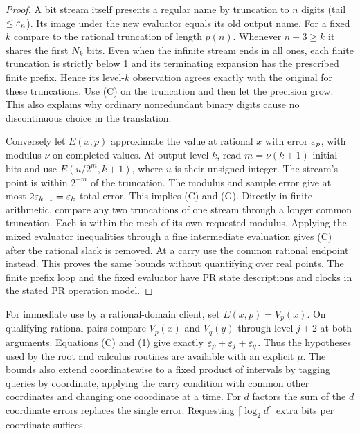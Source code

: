 \begin{proof}
A bit stream itself presents a regular name by truncation to $n$ digits (tail $\le\varepsilon_n$). Its image under the new evaluator equals its old output name. For a fixed $k$ compare to the rational truncation of length $p(n)$. Whenever $n+3\ge k$ it shares the first $N_k$ bits. Even when the infinite stream ends in all ones, each finite truncation is strictly below 1 and its terminating expansion has the prescribed finite prefix. Hence its level-$k$ observation agrees exactly with the original for these truncations. Use (C) on the truncation and then let the precision grow. This also explains why ordinary nonredundant binary digits cause no discontinuous choice in the translation.

Conversely let $E(x,p)$ approximate the value at rational $x$ with error $\varepsilon_p$, with modulus $\nu$ on completed values. At output level $k$, read $m=\nu(k+1)$ initial bits and use $E(u/2^m,k+1)$, where $u$ is their unsigned integer. The stream's point is within $2^{-m}$ of the truncation. The modulus and sample error give at most $2\varepsilon_{k+1}=\varepsilon_k$ total error. This implies (C) and (G). Directly in finite arithmetic, compare any two truncations of one stream through a longer common truncation. Each is within the mesh of its own requested modulus. Applying the mixed evaluator inequalities through a fine intermediate evaluation gives (C) after the rational slack is removed. At a carry use the common rational endpoint instead. This proves the same bounds without quantifying over real points. The finite prefix loop and the fixed evaluator have PR state descriptions and clocks in the stated PR operation model.
\end{proof}

For immediate use by a rational-domain client, set $E(x,p)=V_p(x)$. On qualifying rational pairs compare $V_p(x)$ and $V_q(y)$ through level $j+2$ at both arguments. Equations (C) and (1) give exactly $\varepsilon_p+\varepsilon_j+\varepsilon_q$. Thus the hypotheses used by the root and calculus routines are available with an explicit $\mu$. The bounds also extend coordinatewise to a fixed product of intervals by tagging queries by coordinate, applying the carry condition with common other coordinates and changing one coordinate at a time. For $d$ factors the sum of the $d$ coordinate errors replaces the single error. Requesting $\lceil\log_2 d\rceil$ extra bits per coordinate suffices.
